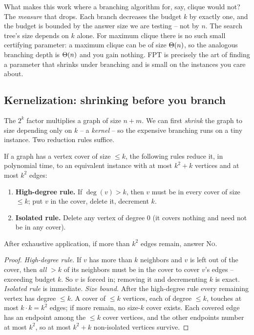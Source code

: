 \begin{whybox}
What makes this work where a branching algorithm for, say, clique would not? The
\emph{measure} that drops. Each branch decreases the budget $k$ by exactly one,
and the budget is bounded by the answer size we are testing -- not by $n$. The
search tree's size depends on $k$ alone. For maximum clique there is no such
small certifying parameter: a maximum clique can be of size $\Theta(n)$, so the
analogous branching depth is $\Theta(n)$ and you gain nothing. FPT is precisely the
art of finding a parameter that shrinks under branching and is small on the
instances you care about.
\end{whybox}

\subsection{Kernelization: shrinking before you branch}
\label{ch29:kernel}

The $2^k$ factor multiplies a graph of size $n+m$. We can first \emph{shrink} the
graph to size depending only on $k$ -- a \emph{kernel} -- so the expensive
branching runs on a tiny instance. Two reduction rules suffice.

\begin{lemma}
\label{ch29:lem-buss}
If a graph has a vertex cover of size $\le k$, the following rules reduce it, in
polynomial time, to an equivalent instance with at most $k^2+k$ vertices and at
most $k^2$ edges:
\begin{enumerate}
  \item \textbf{High-degree rule.} If $\deg(v)>k$, then $v$ must be in every
        cover of size $\le k$; put $v$ in the cover, delete it, decrement $k$.
  \item \textbf{Isolated rule.} Delete any vertex of degree $0$ (it covers
        nothing and need not be in any cover).
\end{enumerate}
After exhaustive application, if more than $k^2$ edges remain, answer \textsc{No}.
\end{lemma}

\begin{proof}
\emph{High-degree rule.} If $v$ has more than $k$ neighbors and $v$ is left out
of the cover, then \emph{all} $>k$ of its neighbors must be in the cover to cover
$v$'s edges -- exceeding budget $k$. So $v$ is forced in; removing it and
decrementing $k$ is exact. \emph{Isolated rule} is immediate. \emph{Size bound.}
After the high-degree rule every remaining vertex has degree $\le k$. A cover of
$\le k$ vertices, each of degree $\le k$, touches at most $k\cdot k=k^2$ edges; if
more remain, no size-$k$ cover exists. Each covered edge has an endpoint among the
$\le k$ cover vertices, and the other endpoints number at most $k^2$, so at most
$k^2+k$ non-isolated vertices survive.
\end{proof}

